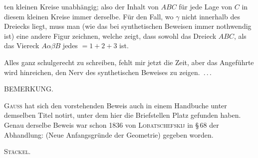 ten kleinen Kreise unabhängig; also der Inhalt von $ABC$ für jede Lage von $C$ in diesem kleinen Kreise immer derselbe. Für den Fall, wo $\gamma$ nicht innerhalb des Dreiecks liegt, muss man (wie das bei synthetischen Beweisen immer nothwendig ist) eine andere Figur zeichnen, welche zeigt, dass sowohl das Dreieck $ABC$, als das Viereck $A\alpha\beta B$ jedes $=1+2+3$ ist.

\begin{center}\end{center}

Alles ganz schulgerecht zu schreiben, fehlt mir jetzt die Zeit, aber das Angeführte wird hinreichen, den Nerv des synthetischen Beweises zu \mbox{zeigen. \mbox{.\,.\,.}}

\medskip

\begin{center}
BEMERKUNG.
\end{center}

\textsc{Gauss} hat sich den vorstehenden Beweis auch in einem Handbuche unter demselben Titel notirt, unter dem hier die Briefstellen Platz gefunden haben. Genau derselbe Beweis war schon 1836 von \textsc{Lobatschefskij} in \S\,68 der Abhandlung:  (Neue Anfangsgründe der Geometrie) gegeben worden.

\begin{flushright}
\textsc{Stäckel}.
\end{flushright}
